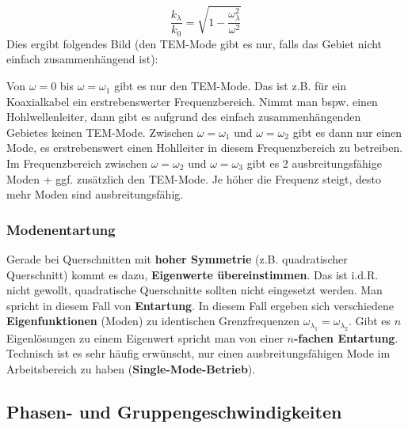 	\begin{equation}
		\frac{ k_\lambda}{ k_0}=\sqrt{1-\frac{\omega_\lambda^2}{\omega^2}}
	\end{equation}
 Dies ergibt folgendes Bild (den TEM-Mode gibt es nur, falls das Gebiet nicht einfach zusammenhängend ist):
	\begin{center}
		
	\end{center}
	Von $\omega=0$ bis $\omega=\omega_1$ gibt es nur den TEM-Mode. Das ist z.B. für ein Koaxialkabel ein erstrebenswerter Frequenzbereich. Nimmt man bspw. einen Hohlwellenleiter, dann gibt es aufgrund des einfach zusammenhängenden Gebietes keinen TEM-Mode. Zwischen $\omega=\omega_1$ und $\omega=\omega_2$ gibt es dann nur einen Mode, es erstrebenswert einen Hohlleiter in diesem Frequenzbereich zu betreiben. Im Frequenzbereich zwischen $\omega=\omega_2$ und $\omega=\omega_3$ gibt es 2 ausbreitungsfähige Moden + ggf. zusätzlich den TEM-Mode. Je höher die Frequenz steigt, desto mehr Moden sind ausbreitungsfähig.
	\subsubsection{Modenentartung}
	Gerade bei Querschnitten mit \textbf{hoher Symmetrie} (z.B. quadratischer Querschnitt) kommt es dazu, \textbf{Eigenwerte übereinstimmen}. Das ist i.d.R. nicht gewollt, quadratische Querschnitte sollten nicht eingesetzt werden. Man spricht in diesem Fall von \textbf{Entartung}. In diesem Fall ergeben sich verschiedene \textbf{Eigenfunktionen} (Moden) zu identischen Grenzfrequenzen \(\omega_{\lambda_1} = \omega_{\lambda_2}\). Gibt es \(n\) Eigenlösungen zu einem Eigenwert spricht man von einer \textbf{\(n\)-fachen Entartung}. Technisch ist es sehr häufig erwünscht, nur einen ausbreitungsfähigen Mode im Arbeitsbereich zu haben (\textbf{Single-Mode-Betrieb}).
\subsection{Phasen- und Gruppengeschwindigkeiten}
